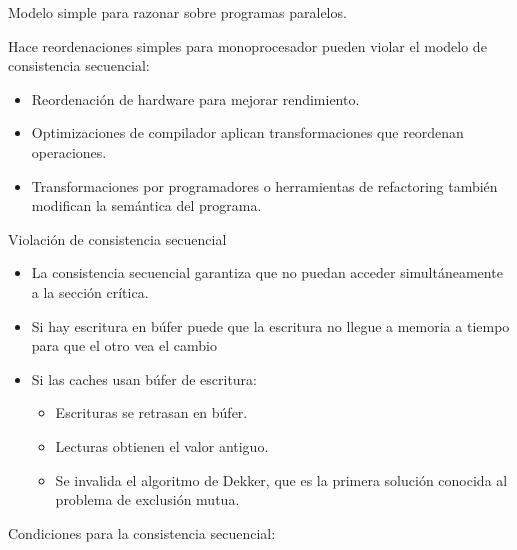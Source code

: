 \documentclass[12pt, twoside, openright]{report} %
\begin{document}
    Modelo simple para razonar sobre programas paralelos.

    Hace reordenaciones simples para monoprocesador pueden violar el
    modelo de consistencia secuencial:

    \begin{itemize}
    
    \item
      Reordenación de hardware para mejorar rendimiento.
    \item
      Optimizaciones de compilador aplican transformaciones que
      reordenan operaciones.
    \item
      Transformaciones por programadores o herramientas de refactoring
      también modifican la semántica del programa.
    \end{itemize}

    Violación de consistencia secuencial

    \begin{itemize}
    
    \item
      La consistencia secuencial garantiza que no puedan acceder
      simultáneamente a la sección crítica.
    \item
      Si hay escritura en búfer puede que la escritura no llegue a
      memoria a tiempo para que el otro vea el cambio
    \item
      Si las caches usan búfer de escritura:

      \begin{itemize}
      
      \item
        Escrituras se retrasan en búfer.
      \item
        Lecturas obtienen el valor antiguo.
      \item
        Se invalida el algoritmo de Dekker, que es la primera solución
        conocida al problema de exclusión mutua.
      \end{itemize}
    \end{itemize}

    Condiciones para la consistencia secuencial:
\end{document}
